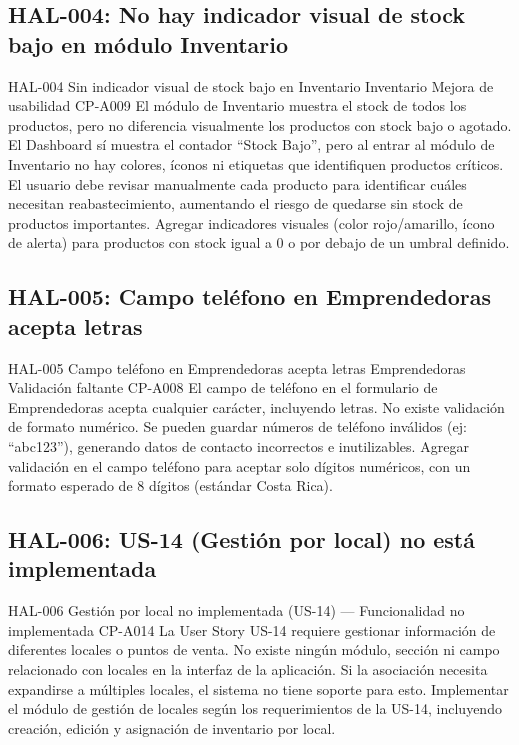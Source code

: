 \subsection{HAL-004: No hay indicador visual de stock bajo en módulo Inventario}
\hallazgo
  {HAL-004}
  {Sin indicador visual de stock bajo en Inventario}
  {\sevMedia}
  {Inventario}
  {Mejora de usabilidad}
  {CP-A009}
  {El módulo de Inventario muestra el stock de todos los productos, pero no diferencia
   visualmente los productos con stock bajo o agotado. El Dashboard sí muestra el
   contador ``Stock Bajo'', pero al entrar al módulo de Inventario no hay colores,
   íconos ni etiquetas que identifiquen productos críticos.}
  {El usuario debe revisar manualmente cada producto para identificar cuáles necesitan
   reabastecimiento, aumentando el riesgo de quedarse sin stock de productos importantes.}
  {Agregar indicadores visuales (color rojo/amarillo, ícono de alerta) para productos
   con stock igual a 0 o por debajo de un umbral definido.}

\subsection{HAL-005: Campo teléfono en Emprendedoras acepta letras}
\hallazgo
  {HAL-005}
  {Campo teléfono en Emprendedoras acepta letras}
  {\sevBaja}
  {Emprendedoras}
  {Validación faltante}
  {CP-A008}
  {El campo de teléfono en el formulario de Emprendedoras acepta cualquier carácter,
   incluyendo letras. No existe validación de formato numérico.}
  {Se pueden guardar números de teléfono inválidos (ej: ``abc123''), generando datos
   de contacto incorrectos e inutilizables.}
  {Agregar validación en el campo teléfono para aceptar solo dígitos numéricos, con
   un formato esperado de 8 dígitos (estándar Costa Rica).}

\subsection{HAL-006: US-14 (Gestión por local) no está implementada}
\hallazgo
  {HAL-006}
  {Gestión por local no implementada (US-14)}
  {\sevMedia}
  {---}
  {Funcionalidad no implementada}
  {CP-A014}
  {La User Story US-14 requiere gestionar información de diferentes locales o puntos de
   venta. No existe ningún módulo, sección ni campo relacionado con locales en la
   interfaz de la aplicación.}
  {Si la asociación necesita expandirse a múltiples locales, el sistema no tiene soporte
   para esto.}
  {Implementar el módulo de gestión de locales según los requerimientos de la US-14,
   incluyendo creación, edición y asignación de inventario por local.}

